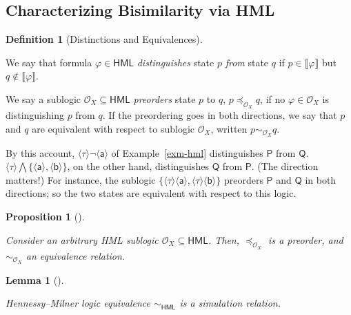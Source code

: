 \documentclass[
  a4paper,
]{report}
\theoremstyle{plain}
\newtheorem{proposition}{Proposition}[section]
\theoremstyle{plain}
\theoremstyle{definition}
\newtheorem{definition}{Definition}[section]
\theoremstyle{plain}
\newtheorem{lemma}{Lemma}[section]
\theoremstyle{definition}
\theoremstyle{remark}
\begin{document}
\subsection{Characterizing Bisimilarity via
HML}\label{characterizing-bisimilarity-via-hml}

\begin{definition}[Distinctions and
Equivalences]\protect\hypertarget{def-distinctions}{}\label{def-distinctions}

We say that formula \(φ ∈ \textsf{HML}\) \emph{distinguishes} state
\(p\) \emph{from} state \(q\) if \(p ∈ \llbracket φ \rrbracket\) but
\(q \notin \llbracket φ \rrbracket\).

We say a sublogic \(\mathcal{O}_{X} ⊆ \textsf{HML}\) \emph{preorders}
state \(p\) to \(q\), \(p \preceq_{\mathcal{O}_{X}} q\), if no
\(φ ∈ \mathcal{O}_{X}\) is distinguishing \(p\) from \(q\). If the
preordering goes in both directions, we say that \(p\) and \(q\) are
equivalent with respect to sublogic \(\mathcal{O}_{X}\), written
\(p \sim_{\mathcal{O}_{X}} q\).

\end{definition}

\noindent  By this account,
\(\langle τ \rangle\neg\langle \mathsf{a} \rangle\) of
Example~\ref{exm-hml} distinguishes \(\mathsf{P}\) from \(\mathsf{Q}\).
\(\langle τ \rangle\textstyle\bigwedge \{\langle \mathsf{a} \rangle, \langle \mathsf{b} \rangle\}\),
on the other hand, distinguishes \(\mathsf{Q}\) from \(\mathsf{P}\).
(The direction matters!) For instance, the sublogic
\(\{\langle τ \rangle\langle \mathsf{a} \rangle, \langle τ \rangle\langle \mathsf{b} \rangle\}\)
preorders \(\mathsf{P}\) and \(\mathsf{Q}\) in both directions; so the
two states are equivalent with respect to this logic.

\begin{proposition}[]\protect\hypertarget{prp-hml-eq}{}\label{prp-hml-eq}

Consider an arbitrary HML sublogic \(\mathcal{O}_{X} ⊆ \textsf{HML}\).
Then, \(\preceq_{\mathcal{O}_{X}}\) is a preorder, and
\(\sim_{\mathcal{O}_{X}}\) an equivalence relation.

\end{proposition}

\begin{lemma}[]\protect\hypertarget{lem-hml-eq-sim}{}\label{lem-hml-eq-sim}

Hennessy--Milner logic equivalence \(\sim_{\textsf{HML}}\) is a
simulation relation.

\end{lemma}
\end{document}
